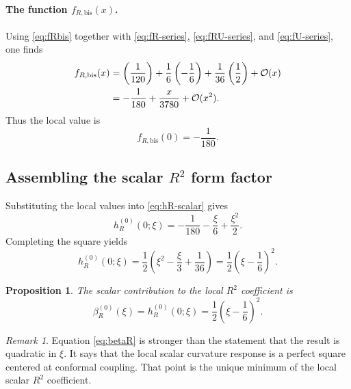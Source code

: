 \documentclass[11pt,a4paper]{article}
\newtheorem{proposition}[theorem]{Proposition}
\theoremstyle{definition}
\theoremstyle{remark}
\newtheorem{remark}[theorem]{Remark}
\begin{document}
\paragraph{The function $f_{R,\mathrm{bis}}(x)$.}
Using \eqref{eq:fRbis} together with \eqref{eq:fR-series},
\eqref{eq:fRU-series}, and \eqref{eq:fU-series}, one finds
\begin{align}
  f_{R,\mathrm{bis}}(x)
  &= \left(\frac{1}{120}\right)
   + \frac{1}{6}\left(-\frac{1}{6}\right)
   + \frac{1}{36}\left(\frac{1}{2}\right)
   + \mathcal O(x)
  \notag\\
  &= -\frac{1}{180}
   + \frac{x}{3780}
   + \mathcal O(x^2).
  \label{eq:fRbis-series}
\end{align}
Thus the local value is
\begin{equation}
  f_{R,\mathrm{bis}}(0) = -\frac{1}{180}.
  \label{eq:fRbis-local}
\end{equation}

\subsection{Assembling the scalar \texorpdfstring{$R^2$}{R2} form factor}

Substituting the local values into \eqref{eq:hR-scalar} gives
\begin{equation}
  h_R^{(0)}(0;\xi)
  = -\frac{1}{180}
  - \frac{\xi}{6}
  + \frac{\xi^2}{2}.
  \label{eq:hR-local-raw}
\end{equation}
Completing the square yields
\begin{equation}
  h_R^{(0)}(0;\xi)
  = \frac{1}{2}
    \left(
      \xi^2 - \frac{\xi}{3} + \frac{1}{36}
    \right)
  = \frac{1}{2}\left(\xi - \frac{1}{6}\right)^2.
  \label{eq:hR-local-square}
\end{equation}

\begin{proposition}
The scalar contribution to the local $R^2$ coefficient is
\begin{equation}
  \boxed{
    \beta_R^{(0)}(\xi)
    = h_R^{(0)}(0;\xi)
    = \frac{1}{2}\left(\xi - \frac{1}{6}\right)^2.
  }
  \label{eq:betaR}
\end{equation}
\end{proposition}

\begin{remark}
Equation \eqref{eq:betaR} is stronger than the statement that the result is
quadratic in $\xi$.  It says that the local scalar curvature response is a
perfect square centered at conformal coupling.  That point is the unique
minimum of the local scalar $R^2$ coefficient.
\end{remark}
\end{document}
